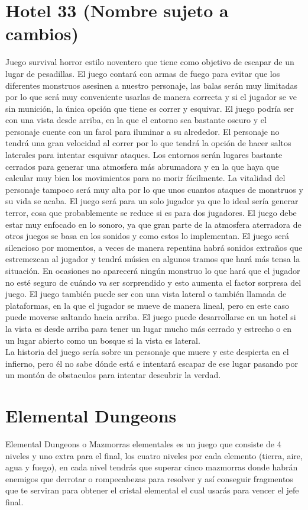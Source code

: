 \documentclass{article}
\begin{document}
\section{Hotel 33 (Nombre sujeto a cambios)} \label{Juego 1}
Juego survival horror estilo noventero que tiene como objetivo de escapar de un lugar de pesadillas. El juego contará con armas de fuego para evitar que los diferentes monstruos asesinen a nuestro personaje, las balas serán muy limitadas por lo que será muy conveniente usarlas de manera correcta y si el jugador se ve sin munición, la única opción que tiene es correr y esquivar. El juego podría ser con una vista desde arriba, en la que el entorno sea bastante oscuro y el personaje cuente con un farol para iluminar a su alrededor. El personaje no tendrá una gran velocidad al correr por lo que tendrá la opción de hacer saltos laterales para intentar esquivar ataques. Los entornos serán lugares bastante cerrados para generar una atmosfera más abrumadora y en la que haya que calcular muy bien los movimientos para no morir fácilmente. La vitalidad del personaje tampoco será muy alta por lo que unos cuantos ataques de monstruos y su vida se acaba. El juego será para un solo jugador ya que lo ideal sería generar terror, cosa que probablemente se reduce si es para dos jugadores. El juego debe estar muy enfocado en lo sonoro, ya que gran parte de la atmosfera aterradora de otros juegos se basa en los sonidos y como estos lo implementan. El juego será silencioso por momentos, a veces de manera repentina habrá sonidos extraños que estremezcan al jugador y tendrá música en algunos tramos que hará más tensa la situación. En ocasiones no aparecerá ningún monstruo lo que hará que el jugador no esté seguro de cuándo va ser sorprendido y esto aumenta el factor sorpresa del juego. El juego también puede ser con una vista lateral o también llamada de plataformas, en la que el jugador se mueve de manera lineal, pero en este caso puede moverse saltando hacia arriba. El juego puede desarrollarse en un hotel si la vista es desde arriba para tener un lugar mucho más cerrado y estrecho o en un lugar abierto como un bosque si la vista es lateral.\\ La historia del juego sería sobre un personaje que muere y este despierta en el infierno, pero él no sabe dónde está e intentará escapar de ese lugar pasando por un montón de obstaculos para intentar descubrir la verdad.

\newpage

\section{Elemental Dungeons} \label{Juego 2}
Elemental Dungeons o Mazmorras elementales es un juego que consiste de 4 niveles y uno extra para el final, los cuatro niveles por cada elemento (tierra, aire, agua y fuego), en cada nivel tendrás que superar cinco mazmorras donde habrán enemigos que derrotar o rompecabezas para resolver y así conseguir fragmentos que te serviran para obtener el cristal elemental el cual usarás para vencer el jefe final.
\end{document}
